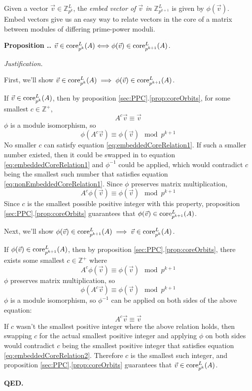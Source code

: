 \documentclass[a4paper, 12pt, reqno]{amsart}
\newcommand\core[3]{\textup{core}_{#1}^{#2}(#3)}
\newcounter{propcounter}[section]
\newenvironment{proposition}[1]
{
	\refstepcounter{propcounter}
	\textbf{Proposition \thesection.\thepropcounter.} \emph{#1}
	
	\emph{Justification.}
}
{
	\textbf{QED.} \\
}
\begin{document}
		Given a vector $\vec{v} \in \mathds{Z}_{p^k}^L$, the \emph{embed vector of $\vec{v}$ in $\mathds{Z}_{p^{k+1}}^L$} is given by $\phi(\vec{v})$. Embed vectors give us
		an easy way to relate vectors in the core of a matrix between modules of differing prime-power moduli.
		
		\begin{proposition}{$\vec{v} \in \core{p^k}{L}{A} \Longleftrightarrow \phi(\vec{v}) \in \core{p^{k+1}}{L}{A}$.}
			\label{prop:embedsInCore}
			First, we'll show $\vec{v} \in \core{p^k}{L}{A} \implies \phi(\vec{v}) \in \core{p^{k+1}}{L}{A}$.
			
			If $\vec{v} \in \core{p^k}{L}{A}$, then by proposition \ref{sec:PPC}.\ref{prop:coreOrbits}, for some smallest $c \in \mathds{Z}^+$,
			\begin{equation}
				\label{eq:nonEmbeddedCoreRelation1}
				A^c\vec{v} \equiv \vec{v}
			\end{equation}
			$\phi$ is a module isomorphism, so
			\begin{equation}
				\label{eq:embeddedCoreRelation1}
				\phi(A^c\vec{v}) \equiv \phi(\vec{v}) \mod{p^{k+1}}
			\end{equation}
			No smaller $c$ can satisfy equation \ref{eq:embeddedCoreRelation1}. If such a smaller number existed, then it could be swapped in to equation 
			\ref{eq:embeddedCoreRelation1} and $\phi^{-1}$ could be applied, which would contradict $c$ being the smallest such number that satisfies equation 
			\ref{eq:nonEmbeddedCoreRelation1}. Since $\phi$ preserves matrix multiplication,
			\[
				A^c\phi(\vec{v}) \equiv \phi(\vec{v}) \mod{p^{k+1}}
			\]
			Since $c$ is the smallest possible positive integer with this property, proposition \ref{sec:PPC}.\ref{prop:coreOrbits} guarantees that 
			$\phi(\vec{v}) \in \core{p^{k+1}}{L}{A}$.
			
			Next, we'll show $\phi(\vec{v}) \in \core{p^{k+1}}{L}{A} \implies \vec{v} \in \core{p^k}{L}{A}$.
			
			If $\phi(\vec{v}) \in \core{p^{k+1}}{L}{A}$, then by proposition \ref{sec:PPC}.\ref{prop:coreOrbits}, there exists some smallest $c \in \mathds{Z}^+$ where
			\begin{equation}
				\label{eq:embeddedCoreRelation2}
				A^c\phi(\vec{v}) \equiv \phi(\vec{v}) \mod{p^{k+1}}
			\end{equation}
			$\phi$ preserves matrix multiplication, so
			\[
				\phi(A^c\vec{v}) \equiv \phi(\vec{v}) \mod{p^{k+1}}
			\]
			$\phi$ is a module isomorphism, so $\phi^{-1}$ can be applied on both sides of the above equation:
			\[
				A^c\vec{v} \equiv \vec{v}
			\]
			If $c$ wasn't the smallest positive integer where the above relation holds, then swapping $c$ for the actual smallest positive integer and applying $\phi$ 
			on both sides would contradict $c$ being the smallest positive integer that satisfies equation \ref{eq:embeddedCoreRelation2}. Therefore $c$ is the smallest 
			such integer, and proposition \ref{sec:PPC}.\ref{prop:coreOrbits} guarantees that $\vec{v} \in \core{p^k}{L}{A}$.
		\end{proposition}
		
\end{document}
